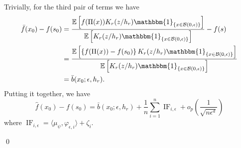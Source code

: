 \documentclass[11pt]{article}
\begin{document}
Trivially, for the third pair of terms we have
\begin{align*}
    \bar{f}(x_0) - f(s_0) &= \frac{\mathbb{E}\left[f(\Pi(x))K_r(z/h_r)\mathbbm{1}_{\{x\in \mathcal{B}(0, \epsilon)\}}\right]}{\mathbb{E}\left[K_r(z/h_r)\mathbbm{1}_{\{x\in \mathcal{B}(0, \epsilon)\}}\right]} - f(s) \\
    &= \frac{\mathbb{E}\left[\left\{f(\Pi(x)) - f(s_0)\right\}K_r(z/h_r)\mathbbm{1}_{\{x\in \mathcal{B}(0, \epsilon)\}}\right]}{\mathbb{E}\left[K_r(z/h_r)\mathbbm{1}_{\{x\in \mathcal{B}(0, \epsilon)\}}\right]}\\
    &= \bar{b}(x_0; \epsilon, h_r).
\end{align*}
Putting it together, we have 
\begin{equation*}
    \hat{f}(x_0) - f(s_0) = \bar{b}(x_0; \epsilon, h_r) + \frac{1}{n}\sum_{i = 1}^n\operatorname{IF}_{i, \epsilon} + o_p\left(\frac{1}{\sqrt{n\epsilon^d}}\right)
\end{equation*}
where $\operatorname{IF}_{i, \epsilon} = \langle \mu_{\psi}, \varphi_{\epsilon, i}\rangle + \zeta_i.$

\qed{}
\end{document}

